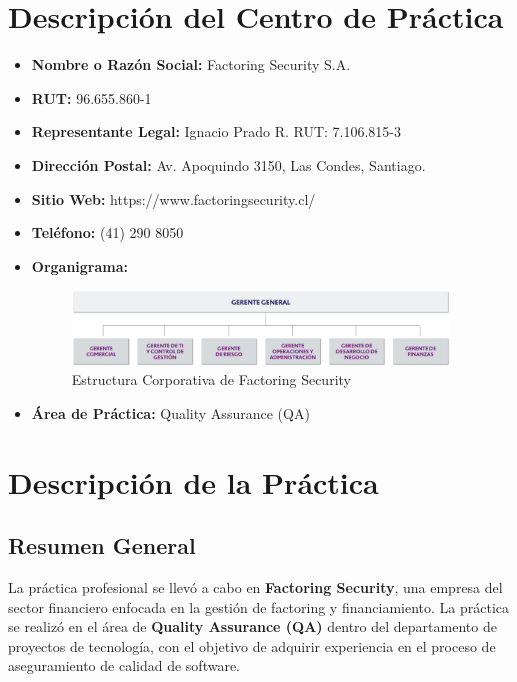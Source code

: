 \documentclass[12pt,a4paper]{report}
\begin{document}
\section{Descripción del Centro de Práctica}

\begin{itemize}
    \item \textbf{Nombre o Razón Social:} Factoring Security S.A.
    \item \textbf{RUT:} 96.655.860-1
    \item \textbf{Representante Legal:} Ignacio Prado R. RUT: 7.106.815-3
    \item \textbf{Dirección Postal:} Av. Apoquindo 3150, Las Condes, Santiago.
    \item \textbf{Sitio Web:} https://www.factoringsecurity.cl/
    \item \textbf{Teléfono:} (41) 290 8050
    \item \textbf{Organigrama:} \begin{figure}[H]
      \centering
      \includegraphics[width=10cm]{images/organigrama.png}
      \caption{Estructura Corporativa de Factoring Security}
    \end{figure}
    \item \textbf{Área de Práctica:} Quality Assurance (QA)
\end{itemize}

\bigskip

\section{Descripción de la Práctica}

\subsection{Resumen General}

La práctica profesional se llevó a cabo en \textbf{Factoring Security}, una empresa del sector financiero enfocada en la gestión de factoring y financiamiento. La práctica se realizó en el área de \textbf{Quality Assurance (QA)} dentro del departamento de proyectos de tecnología, con el objetivo de adquirir experiencia en el proceso de aseguramiento de calidad de software.
\end{document}

